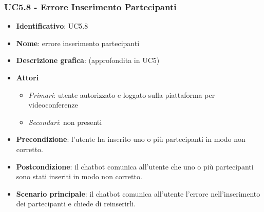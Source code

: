 \subsubsection{UC5.8 - Errore Inserimento Partecipanti}
\begin{itemize}
    \item \textbf{Identificativo}: UC5.8
    \item \textbf{Nome}: errore inserimento partecipanti
    \item \textbf{Descrizione grafica}: (approfondita in UC5)
    \item \textbf{Attori}
 \begin{itemize} 
    \item \textit{Primari}: utente autorizzato e loggato sulla piattaforma per videoconferenze
    \item \textit{Secondari}: non presenti
 \end{itemize}
 \item \textbf{Precondizione}: l'utente ha inserito uno o più partecipanti in modo non corretto.
 \item \textbf{Postcondizione}: il chatbot comunica all'utente che uno o più partecipanti sono stati inseriti in modo non corretto.
 \item \textbf{Scenario principale}: il chatbot comunica all'utente l'errore nell'inserimento dei partecipanti e chiede di reinserirli.
\end{itemize}
\newpage